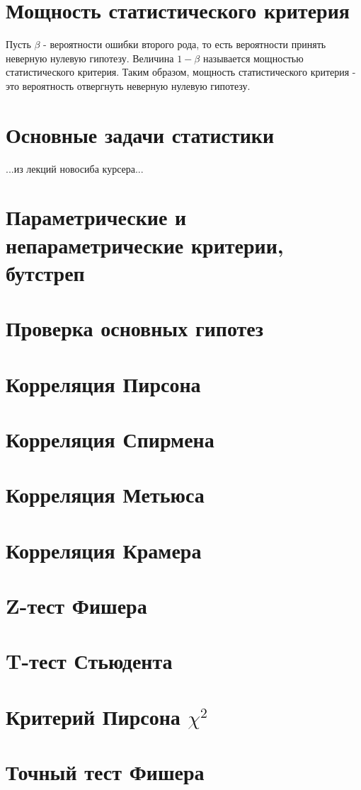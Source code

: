 \section{Мощность статистического критерия}

Пусть $\beta$ - вероятности ошибки второго рода, то есть вероятности принять неверную нулевую гипотезу. Величина $1 - \beta$ называется мощностью статистического критерия. Таким образом, мощность статистического критерия - это вероятность отвергнуть неверную нулевую гипотезу.

\section{Основные задачи статистики}

...из лекций новосиба  курсера...


\section{Параметрические и непараметрические критерии, бутстреп}


\section{Проверка основных гипотез}


\section{Корреляция Пирсона}


\section{Корреляция Спирмена}


\section{Корреляция Метьюса}


\section{Корреляция Крамера}


\section{Z-тест Фишера}


\section{T-тест Стьюдента}


\section{Критерий Пирсона $\chi^2$}


\section{Точный тест Фишера}



